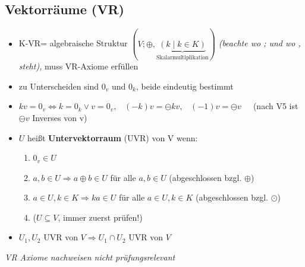\documentclass[10pt,a4paper]{article}
\begin{document}
\subsection{Vektorräume (VR)}
\begin{itemize}


\item K-VR= algebraische Struktur $(V; \oplus , \underbrace{(k \mid k \in K)}_{\text{Skalarmultiplikation}})$ \textit{(beachte wo ; und wo , steht),} muss VR-Axiome erfüllen
\item zu Unterscheiden sind $0_{v}$ und $0_{k}$, beide eindeutig bestimmt 
\item $kv=0_{v} \Leftrightarrow k=0_{k} \lor v=0_{v},\;\;\; (-k)v=\ominus kv, \;\;\; (-1)v=\ominus v\;\;\;\;$ (nach V5 ist $\ominus v$ Inverses von v)
\item $U$ heißt \textbf{Untervektorraum} (UVR) von V wenn: 
\begin{enumerate} 
\item $0_{v} \in U$
\item $a,b\in U \Rightarrow a\oplus b \in U$ für alle $a,b \in U$ (abgeschlossen bzgl. $\oplus$)
\item $a\in U, k\in K \Rightarrow ka \in U$ für alle $a\in U,k\in K$ (abgeschlossen bzgl. $\odot$)
\item ($U\subseteq V$, immer zuerst prüfen!)
\end{enumerate}
\item $U_{1},U_{2}$ UVR von $V \Rightarrow U_{1} \cap U_{2}$ UVR von $V$
\end{itemize} 
\textit{VR Axiome nachweisen nicht prüfungsrelevant}
\end{document}
